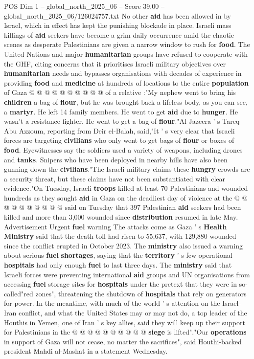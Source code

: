 \begin{textsample}{POS Dim 1 – global\_north\_2025\_06 – Score 39.00 – global\_north\_2025\_06/126024757.txt}
No other \textbf{aid} has been allowed in by Israel, which in effect has kept the punishing blockade in place.
Israeli mass killings of \textbf{aid} seekers have become a grim daily occurrence amid the chaotic scenes as desperate Palestinians are given a narrow window to rush for \textbf{food}.
The United Nations and major \textbf{humanitarian} groups have refused to cooperate with the GHF, citing concerns that it prioritises Israeli military objectives over \textbf{humanitarian} needs and bypasses organisations with decades of experience in providing \textbf{food} and \textbf{medicine} at hundreds of locations to the entire \textbf{population} of Gaza @ @ @ @ @ @ @ @ @ @ of a relative :"My nephew went to bring his \textbf{children} a bag of \textbf{flour}, but he was brought back a lifeless body, as you can see, a \textbf{martyr}.
He left 14 family members.
He went to get \textbf{aid} due to \textbf{hunger}.
He wasn't a resistance fighter.
He went to get a bag of \textbf{flour}."Al Jazeera ' s Tareq Abu Azzoum, reporting from Deir el-Balah, said,"It ' s very clear that Israeli forces are targeting \textbf{civilians} who only went to get bags of \textbf{flour} or boxes of \textbf{food}.
Eyewitnesses say the soldiers used a variety of weapons, including drones and \textbf{tanks}.
Snipers who have been deployed in nearby hills have also been gunning down the \textbf{civilians}."The Israeli military claims these \textbf{hungry} crowds are a security threat, but these claims have not been substantiated with clear evidence."On Tuesday, Israeli \textbf{troops} killed at least 70 Palestinians and wounded hundreds as they sought \textbf{aid} in Gaza on the deadliest day of violence at the @ @ @ @ @ @ @ @ @ @ said on Tuesday that 397 Palestinian \textbf{aid} seekers had been killed and more than 3,000 wounded since \textbf{distribution} resumed in late May.
Advertisement Urgent \textbf{fuel} warning The attacks come as Gaza ' s \textbf{Health} \textbf{Ministry} said that the death toll had risen to 55,637, with 129,880 wounded since the conflict erupted in October 2023.
The \textbf{ministry} also issued a warning about serious \textbf{fuel} \textbf{shortages}, saying that the \textbf{territory} ' s few operational \textbf{hospitals} had only enough \textbf{fuel} to last three days.
The \textbf{ministry} said that Israeli forces were preventing international \textbf{aid} groups and UN organisations from accessing \textbf{fuel} storage sites for \textbf{hospitals} under the pretext that they were in so-called"red zones", threatening the shutdown of \textbf{hospitals} that rely on generators for power.
In the meantime, with much of the world ' s attention on the Israel-Iran conflict, and what the United States may or may not do, a top leader of the Houthis in Yemen, one of Iran ' s key allies, said they will keep up their support for Palestinians in the @ @ @ @ @ @ @ @ @ @ \textbf{siege} is lifted"."Our \textbf{operations} in support of Gaza will not cease, no matter the sacrifices", said Houthi-backed president Mahdi al-Mashat in a statement Wednesday.


\end{textsample}
